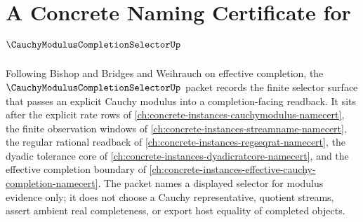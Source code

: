\chapter{A Concrete Naming Certificate for $\CauchyModulusCompletionSelectorUp$}
\label{ch:concrete-instances-cauchy-modulus-completion-selector-namecert}

Following Bishop and Bridges and Weihrauch on effective completion, the
$\CauchyModulusCompletionSelectorUp$ packet records the finite selector surface
that passes an explicit Cauchy modulus into a completion-facing readback. It
sits after the explicit rate rows of
\autoref{ch:concrete-instances-cauchymodulus-namecert}, the finite observation
windows of \autoref{ch:concrete-instances-streamname-namecert}, the regular
rational readback of \autoref{ch:concrete-instances-regseqrat-namecert}, the
dyadic tolerance core of \autoref{ch:concrete-instances-dyadicratcore-namecert},
and the effective completion boundary of
\autoref{ch:concrete-instances-effective-cauchy-completion-namecert}. The
packet names a displayed selector for modulus evidence only; it does not choose
a Cauchy representative, quotient streams, assert ambient real completeness, or
export host equality of completed objects.

